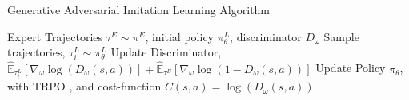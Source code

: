\begin{algorithm}[tb]
\caption{Generative Adversarial Imitation Learning Algorithm}\label{alg:gail}
\begin{algorithmic}
\Require Expert Trajectories $\tau^{E} \sim \pi^{E}$, initial policy $\pi^{L}_{\theta}$, discriminator $D_{\omega}$
    \State Sample trajectories, $\tau^{L}_{i} \sim \pi^{L}_{\theta}$
    \State Update Discriminator, $\mathbb{\hat{E}}_{\tau^{L}_{i}}\left [\nabla_{\omega} \log(D_{\omega}(s,a))\right ] +\mathbb{\hat{E}}_{\tau^{E}}\left [\nabla_{\omega} \log(1 - D_{\omega}(s,a))\right ]$
    \State Update Policy $\pi_{\theta}$, with TRPO \cite{schulman2015trpo}, and cost-function $C(s,a)=\log(D_{\omega}(s,a))$ 
\EndFor
\end{algorithmic}
\end{algorithm}
